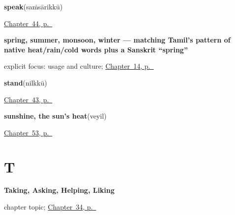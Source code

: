 \noindent\begin{minipage}[t]{\linewidth}
\raggedright
\textbf{speak}\enspace\emph{}\enspace(saṁsārikkū)\par
\footnotesize \hyperref[ch:ml-see-say]{Chapter~44, p.~\pageref*{ch:ml-see-say}}
\end{minipage}\par\smallskip

\noindent\begin{minipage}[t]{\linewidth}
\raggedright
\textbf{spring, summer, monsoon, winter — matching Tamil's pattern of native heat/rain/cold words plus a Sanskrit \textquotedblleft{}spring\textquotedblright{}}\enspace\emph{   }\par
\footnotesize explicit focus: usage and culture; \hyperref[ch:ml-seasons]{Chapter~14, p.~\pageref*{ch:ml-seasons}}
\end{minipage}\par\smallskip

\noindent\begin{minipage}[t]{\linewidth}
\raggedright
\textbf{stand}\enspace\emph{}\enspace(nilkkū)\par
\footnotesize \hyperref[ch:ml-more-verbs]{Chapter~43, p.~\pageref*{ch:ml-more-verbs}}
\end{minipage}\par\smallskip

\noindent\begin{minipage}[t]{\linewidth}
\raggedright
\textbf{sunshine, the sun's heat}\enspace\emph{}\enspace(veyil)\par
\footnotesize \hyperref[ch:ml-overhead]{Chapter~53, p.~\pageref*{ch:ml-overhead}}
\end{minipage}\par\smallskip

\section*{T}

\noindent\begin{minipage}[t]{\linewidth}
\raggedright
\textbf{Taking, Asking, Helping, Liking}\par
\footnotesize chapter topic; \hyperref[ch:ml-taking-asking-helping-liking]{Chapter~34, p.~\pageref*{ch:ml-taking-asking-helping-liking}}
\end{minipage}\par\smallskip

